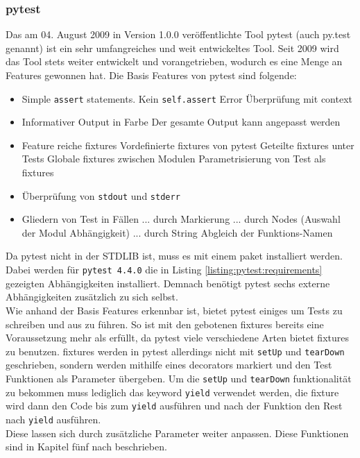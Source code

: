 \subsubsection{pytest}\label{python-tools:pytest}\mbox{}
\newline
Das am 04. August 2009 in Version 1.0.0 veröffentlichte Tool pytest (auch py.test genannt)
ist ein sehr umfangreiches und weit entwickeltes Tool. Seit 2009 wird das Tool stets
weiter entwickelt und vorangetrieben, wodurch es eine Menge an Features gewonnen hat.
\noindent
Die Basis Features von pytest sind folgende:
\begin{itemize}
    \item Simple \lstinline{assert} statements.
    \subitem Kein \lstinline{self.assert}
    \subitem Error Überprüfung mit \Gls{context}
    \item Informativer Output in Farbe
    \subitem Der gesamte Output kann angepasst werden
    \item Feature reiche \Glspl{fixture}
    \subitem Vordefinierte \Glspl{fixture} von pytest
    \subitem Geteilte \Glspl{fixture} unter Tests
    \subitem Globale \Glspl{fixture} zwischen Modulen
    \subitem Parametrisierung von Test als \Glspl{fixture}
    \item Überprüfung von \lstinline{stdout} und \lstinline{stderr}
    \item Gliedern von Test in Fällen
    \subitem ... durch Markierung
    \subitem ... durch Nodes (Auswahl der Modul Abhängigkeit)
    \subitem ... durch String Abgleich der Funktions-Namen
\end{itemize}
\noindent
Da pytest nicht in der STDLIB ist, muss es mit einem \Gls{paket} installiert werden.
Dabei werden für \lstinline{pytest 4.4.0} die in Listing \ref{listing:pytest:requirements}
gezeigten Abhängigkeiten installiert. Demnach benötigt pytest sechs externe Abhängigkeiten
zusätzlich zu sich selbst.
\newline
\\
Wie anhand der Basis Features erkennbar ist, bietet pytest einiges um Tests zu schreiben und
aus zu führen. So ist mit den gebotenen \Glspl{fixture} bereits eine Voraussetzung mehr als
erfüllt, da pytest viele verschiedene Arten bietet \Glspl{fixture} zu benutzen.
\Glspl{fixture} werden in pytest allerdings nicht mit \lstinline{setUp} und \lstinline{tearDown}
geschrieben, sondern werden mithilfe eines \glspl{decorator} markiert und den Test Funktionen
als Parameter übergeben. Um die \lstinline{setUp} und \lstinline{tearDown} funktionalität zu
bekommen muss lediglich das keyword \lstinline{yield} verwendet werden, die \Gls{fixture} wird
dann den Code bis zum \lstinline{yield} ausführen und nach der Funktion den Rest nach
\lstinline{yield} ausführen.
\newline
\\
Diese lassen sich durch zusätzliche Parameter weiter anpassen. Diese
Funktionen sind in Kapitel fünf nach \cite{docs.pytest.org:4.4} beschrieben.

